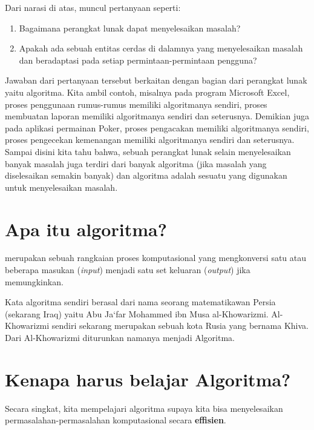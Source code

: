 Dari narasi di atas, muncul pertanyaan seperti:
\begin{enumerate}
	\item Bagaimana perangkat lunak dapat menyelesaikan masalah?
	\item Apakah ada sebuah entitas cerdas di dalamnya yang menyelesaikan masalah dan beradaptasi pada setiap permintaan-permintaan pengguna?
\end{enumerate}
  
Jawaban dari pertanyaan tersebut berkaitan dengan bagian dari perangkat lunak yaitu algoritma. Kita ambil contoh, misalnya pada program Microsoft Excel, proses penggunaan rumus-rumus memiliki algoritmanya sendiri, proses membuatan laporan memiliki algoritmanya sendiri dan seterusnya. Demikian juga pada aplikasi permainan Poker, proses pengacakan memiliki algoritmanya sendiri, proses pengecekan kemenangan memiliki algoritmanya sendiri dan seterusnya. Sampai disini kita tahu bahwa, sebuah perangkat lunak selain menyelesaikan banyak masalah juga terdiri dari banyak algoritma (jika masalah yang diselesaikan semakin banyak) dan algoritma adalah sesuatu yang digunakan untuk menyelesaikan masalah.

\section{Apa itu algoritma?}
 merupakan sebuah rangkaian proses komputasional yang mengkonversi satu atau beberapa masukan (\textit{input}) menjadi satu set keluaran (\textit{output}) jika memungkinkan. 

Kata algoritma sendiri berasal dari nama seorang matematikawan Persia (sekarang Iraq) yaitu Abu Ja`far Mohammed ibn Musa al-Khowarizmi. Al-Khowarizmi sendiri sekarang merupakan sebuah kota Rusia yang bernama Khiva. Dari Al-Khowarizmi diturunkan namanya menjadi Algoritma. 

\section{Kenapa harus belajar Algoritma?}
Secara singkat, kita mempelajari algoritma supaya kita bisa menyelesaikan permasalahan-permasalahan komputasional secara \textbf{effisien}.  

